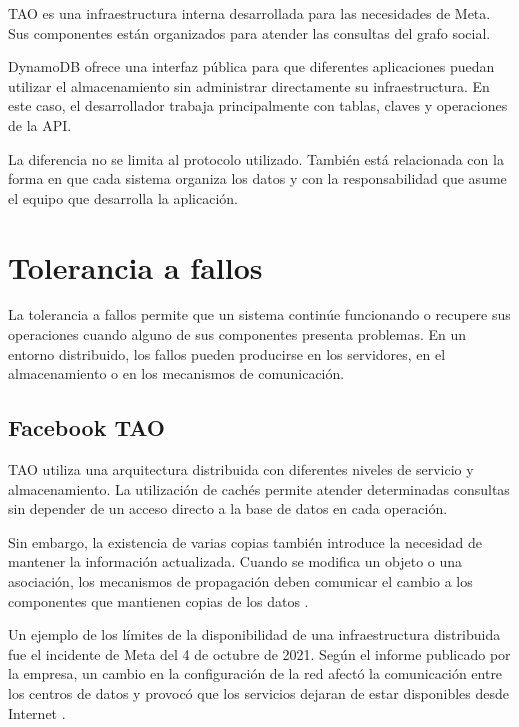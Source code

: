\documentclass[12pt,a4paper]{article}
\begin{document}
TAO es una infraestructura interna desarrollada para las necesidades de Meta. Sus componentes están organizados para atender las consultas del grafo social.

DynamoDB ofrece una interfaz pública para que diferentes aplicaciones puedan utilizar el almacenamiento sin administrar directamente su infraestructura. En este caso, el desarrollador trabaja principalmente con tablas, claves y operaciones de la API.

La diferencia no se limita al protocolo utilizado. También está relacionada con la forma en que cada sistema organiza los datos y con la responsabilidad que asume el equipo que desarrolla la aplicación.

\section{Tolerancia a fallos}

La tolerancia a fallos permite que un sistema continúe funcionando o recupere sus operaciones cuando alguno de sus componentes presenta problemas. En un entorno distribuido, los fallos pueden producirse en los servidores, en el almacenamiento o en los mecanismos de comunicación.

\subsection{Facebook TAO}

TAO utiliza una arquitectura distribuida con diferentes niveles de servicio y almacenamiento. La utilización de cachés permite atender determinadas consultas sin depender de un acceso directo a la base de datos en cada operación.

Sin embargo, la existencia de varias copias también introduce la necesidad de mantener la información actualizada. Cuando se modifica un objeto o una asociación, los mecanismos de propagación deben comunicar el cambio a los componentes que mantienen copias de los datos \cite{bronson2013tao}.

Un ejemplo de los límites de la disponibilidad de una infraestructura distribuida fue el incidente de Meta del 4 de octubre de 2021. Según el informe publicado por la empresa, un cambio en la configuración de la red afectó la comunicación entre los centros de datos y provocó que los servicios dejaran de estar disponibles desde Internet \cite{meta2021outage}.
\end{document}
